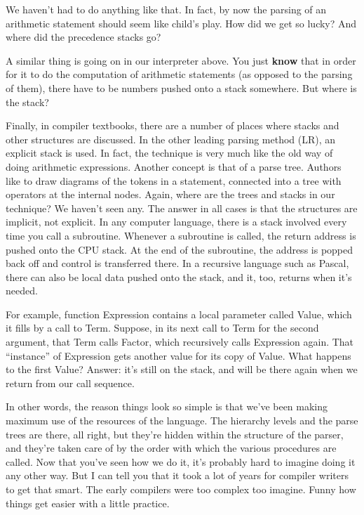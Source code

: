We haven't  had  to  do  anything like that. In fact, by now the parsing of an arithmetic statement should seem like child's play. How did we get so lucky?  And where did the precedence stacks go?

A similar thing is going on  in  our interpreter above. You just {\bfseries know} that in  order  for  it  to do the computation of arithmetic statements (as opposed to the parsing of them), there have  to be numbers pushed onto a stack somewhere. But where is the stack?

Finally, in compiler textbooks, there are  a  number  of  places where  stacks  and  other structures are discussed. In the other leading parsing method (LR), an explicit stack is used. In fact, the technique is very  much  like the old way of doing arithmetic expressions. Another concept  is  that of a parse tree. Authors like to draw diagrams  of  the  tokens  in a statement, connected into a tree with  operators  at the internal nodes. Again, where are the trees and stacks in our technique?  We haven't seen any. The answer in all cases is that the structures are  implicit, not explicit. In  any computer language, there is a stack involved every  time  you  call  a  subroutine. Whenever a subroutine  is called, the return address is pushed onto the CPU stack. At the end of the subroutine, the address is popped back off and control is  transferred  there. In a recursive language such as Pascal, there can also be local data pushed onto the stack, and  it, too, returns when it's needed.

For example, function  Expression  contains  a  local  parameter called  Value, which it fills by a call to Term. Suppose, in its next call to  Term  for  the  second  argument, that  Term calls Factor, which recursively  calls  Expression  again. That ``instance'' of Expression gets another value for its  copy  of Value. What happens  to  the  first  Value?    Answer: it's still on the stack, and  will  be  there  again  when  we return from our call sequence.

In other words, the reason things look so simple  is  that  we've been making maximum use of the resources of the  language. The hierarchy levels  and  the  parse trees are there, all right, but they're hidden within the  structure  of  the parser, and they're taken care of by the order with which the various  procedures are called. Now that you've seen how we do it, it's probably hard to imagine doing it  any other way. But I can tell you that it took a lot of years for compiler writers to get that smart. The early compilers were too complex  too  imagine. Funny how things get easier with a little practice.

